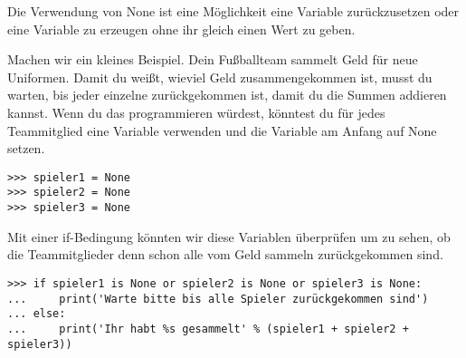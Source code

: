 Die Verwendung von None ist eine Möglichkeit eine Variable zurückzusetzen oder eine Variable zu erzeugen ohne ihr gleich einen Wert zu geben.
\par
Machen wir ein kleines Beispiel. Dein Fußballteam sammelt Geld für neue Uniformen. Damit du weißt, wieviel Geld zusammengekommen ist, musst du warten, bis jeder einzelne zurückgekommen ist, damit du die Summen addieren kannst. Wenn du das programmieren würdest, könntest du für jedes Teammitglied eine Variable verwenden und die Variable am Anfang auf None setzen.

\begin{Verbatim}[frame=single]
>>> spieler1 = None
>>> spieler2 = None
>>> spieler3 = None
\end{Verbatim}

Mit einer if-Bedingung könnten wir diese Variablen überprüfen um zu sehen, ob die Teammitglieder denn schon alle vom Geld sammeln zurückgekommen sind.

\begin{Verbatim}[frame=single]
>>> if spieler1 is None or spieler2 is None or spieler3 is None:
...     print('Warte bitte bis alle Spieler zurückgekommen sind')
... else:
...     print('Ihr habt %s gesammelt' % (spieler1 + spieler2 + spieler3))
\end{Verbatim}

